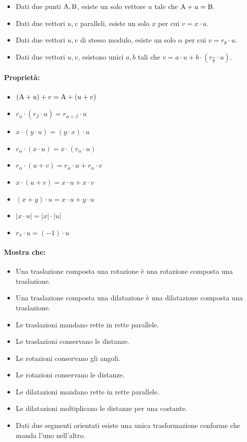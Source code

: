 \documentclass{article}
\begin{document}
\begin{itemize}
\item Dati due punti ${\rm A}, {\rm B}$, esiste un solo vettore $u$ tale che ${\rm A} + u = {\rm B}$.
\item Dati due vettori $u, v$ paralleli, esiste un solo $x$ per cui $v = x \cdot u$.
\item Dati due vettori $u, v$ di stesso modulo, esiste un solo $\alpha$ per cui $v = r_\theta \cdot u$.
\item Dati due vettori $u, v$, esistono unici $a, b$ tali che $v = a \cdot u + b \cdot (r_\frac{\pi}{2} \cdot u)$.
\end{itemize}

\paragraph{Proprietà:}

\begin{itemize}
\item $({\rm A} + u) + v = {\rm A} + (u + v) $
\item $r_\alpha \cdot (r_\beta \cdot u) = r_{\alpha + \beta} \cdot u$
\item $x \cdot (y \cdot u) = (y \cdot x) \cdot u$
\item $r_\alpha \cdot (x \cdot u) = x \cdot (r_\alpha \cdot u)$
\item $r_\alpha \cdot (u + v) = r_\alpha \cdot u + r_\alpha \cdot v$
\item $x \cdot (u + v) = x \cdot u + x \cdot v$
\item $(x + y) \cdot u = x \cdot u + y \cdot u$
\item $|x \cdot u| = |x| \cdot |u|$
\item $r_\pi \cdot u = (- 1) \cdot u$
\end{itemize}

\paragraph{Mostra che:}

\begin{itemize}
\item Una traslazione composta una rotazione è una rotazione composta una traslazione.
\item Una traslazione composta una dilatazione è una dilatazione composta una traslazione.
\item Le traslazioni mandano rette in rette parallele.
\item Le traslazioni conservano le distanze.
\item Le rotazioni conservano gli angoli.
\item Le rotazioni conservano le distanze.
\item Le dilatazioni mandano rette in rette parallele.
\item Le dilatazioni moltiplicano le distanze per una costante.
\item Dati due segmenti orientati esiste una unica trasformazione conforme che manda l'uno nell'altro.
\end{itemize}
\end{document}

